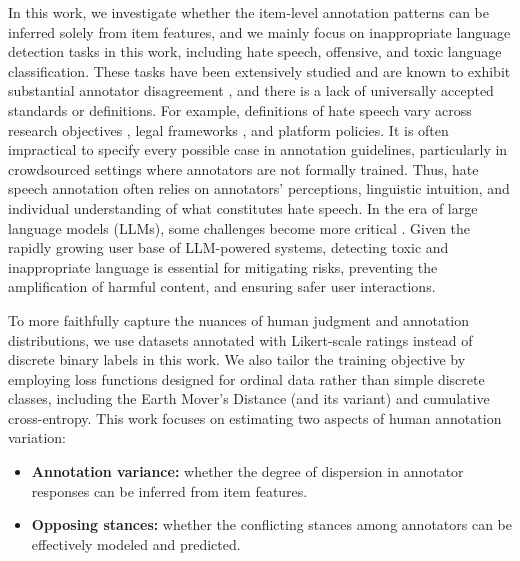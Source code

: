 \documentclass{article} %
\begin{document}
\vspace{0.15cm}

In this work, we investigate whether the item-level annotation patterns can be inferred solely from item features, and we mainly focus on inappropriate language detection tasks in this work, including hate speech, offensive, and toxic language classification. 
These tasks have been extensively studied and are known to exhibit substantial annotator disagreement \citep{sang2022origin}, and there is a lack of universally accepted standards or definitions. 
For example, definitions of hate speech vary across research objectives \citep{talat2016hateful}, legal frameworks \citep{ec_hate_speech_code_2016}, and platform policies. It is often impractical to specify every possible case in annotation guidelines, particularly in crowdsourced settings where annotators are not formally trained. Thus, hate speech annotation often relies on annotators’ perceptions, linguistic intuition, and individual understanding of what constitutes hate speech. In the era of large language models (LLMs), some challenges become more critical \citep{weidinger2021ethical}. Given the rapidly growing user base of LLM-powered systems, detecting toxic and inappropriate language is essential for mitigating risks, preventing the amplification of harmful content, and ensuring safer user interactions.
\vspace{0.15cm}


To more faithfully capture the nuances of human judgment and annotation distributions,
we use datasets annotated with Likert-scale ratings instead of discrete binary labels in this work. We also tailor the training objective by employing loss functions designed for ordinal data rather than simple discrete classes, including the Earth Mover’s Distance (and its variant) and cumulative cross-entropy. This work focuses on estimating two aspects of human annotation variation:

\vspace{-2pt}

\begin{itemize}
    \item \textbf{Annotation variance:} whether the degree of dispersion in annotator responses can be inferred from item features.  
\vspace{-5pt}
    \item \textbf{Opposing stances:} whether the conflicting stances among annotators can be effectively modeled and predicted.
\end{itemize}
\vspace{-2pt}
\end{document}
